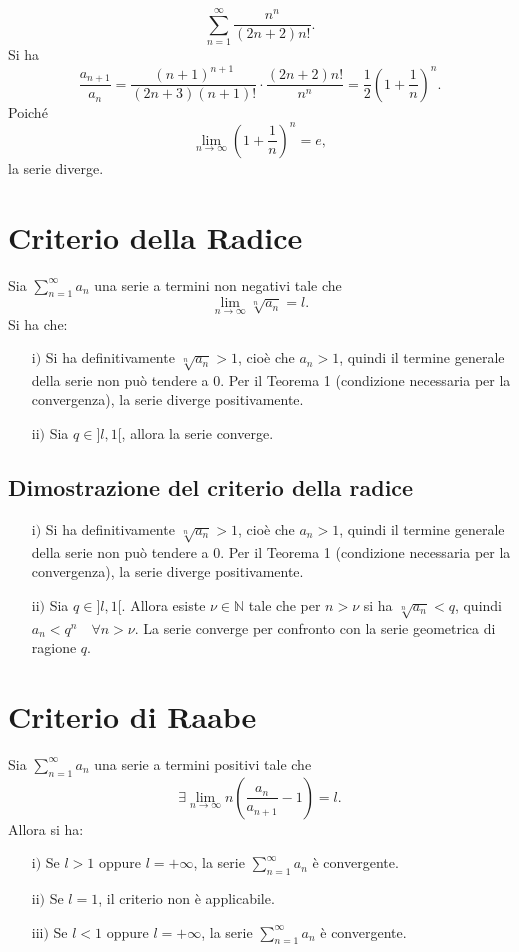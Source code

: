 \documentclass{article}
\begin{document}
\[
\sum_{n=1}^{\infty} \frac{n^n}{(2n+2)n!}.
\]
Si ha
\[
\frac{a_{n+1}}{a_n} = \frac{(n+1)^{n+1}}{(2n+3)(n+1)!} \cdot \frac{(2n+2)n!}{n^n} = \frac{1}{2} \left( 1 + \frac{1}{n} \right)^n.
\]
Poiché
\[
\lim_{n \to \infty} \left( 1 + \frac{1}{n} \right)^n = e,
\]
la serie diverge.

\section*{Criterio della Radice}

Sia \( \sum_{n=1}^{\infty} a_n \) una serie a termini non negativi tale che
\[
\lim_{n \to \infty} \sqrt[n]{a_n} = l.
\]
Si ha che:
\begin{itemize}
    \item[\( \text{i)} \)] Si ha definitivamente \( \sqrt[n]{a_n} > 1 \), cioè che \( a_n > 1 \), quindi il termine generale della serie non può tendere a \( 0 \). Per il Teorema 1 (condizione necessaria per la convergenza), la serie diverge positivamente.
    \item[\( \text{ii)} \)] Sia \( q \in ]l, 1[ \), allora la serie converge.
\end{itemize}
\subsection*{Dimostrazione del criterio della radice}
\begin{itemize}
    \item[\( \text{i)} \)] Si ha definitivamente \( \sqrt[n]{a_n} > 1 \), cioè che \( a_n > 1 \), quindi il termine generale della serie non può tendere a \( 0 \). Per il Teorema 1 (condizione necessaria per la convergenza), la serie diverge positivamente.
\end{itemize}

\begin{itemize}
    \item[\( \text{ii)} \)] Sia \( q \in ]l, 1[ \). Allora esiste \( \nu \in \mathbb{N} \) tale che per \( n > \nu \) si ha \( \sqrt[n]{a_n} < q \), quindi \( a_n < q^n \quad \forall n > \nu \). La serie converge per confronto con la serie geometrica di ragione \( q \).
\end{itemize}


\section*{Criterio di Raabe}

Sia \( \sum_{n=1}^{\infty} a_n \) una serie a termini positivi tale che 
\[
\exists \lim_{n \to \infty} n \left( \frac{a_n}{a_{n+1}} - 1 \right) = l.
\]
Allora si ha:
\begin{itemize}
    \item[\( \text{i)} \)] Se \( l > 1 \) oppure \( l = +\infty \), la serie \( \sum_{n=1}^{\infty} a_n \) è convergente.
    \item[\( \text{ii)} \)] Se \( l = 1 \), il criterio non è applicabile.
    \item[\( \text{iii)} \)] Se \( l < 1 \) oppure \( l = +\infty \), la serie \( \sum_{n=1}^{\infty} a_n \) è convergente.
\end{itemize}
\end{document}
